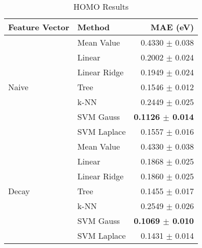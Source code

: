 \documentclass[10pt]{article}
\begin{document}



\begin{table}[H]
  \centering
  \caption{HOMO Results}
  \begin{tabular}{llr}
            Feature Vector     & Method       & MAE (eV)                \\
    \hline\hline
    \multirow{7}{*}{Naive} & Mean Value   & 0.4330 $\pm$ 0.038 \\
                               & Linear       & 0.2002 $\pm$ 0.024 \\
                               & Linear Ridge & 0.1949 $\pm$ 0.024 \\
                               & Tree         & 0.1546 $\pm$ 0.012 \\
                               & k-NN         & 0.2449 $\pm$ 0.025 \\
                               & SVM Gauss    & \textbf{0.1126 $\pm$ 0.014} \\
                               & SVM Laplace  & 0.1557 $\pm$ 0.016 \\
    \hline
    \multirow{7}{*}{Decay}     & Mean Value   & 0.4330 $\pm$ 0.038 \\
                               & Linear       & 0.1868 $\pm$ 0.025 \\
                               & Linear Ridge & 0.1860 $\pm$ 0.025 \\
                               & Tree         & 0.1455 $\pm$ 0.017 \\
                               & k-NN         & 0.2549 $\pm$ 0.026 \\
                               & SVM Gauss    & \textbf{0.1069 $\pm$ 0.010} \\
                               & SVM Laplace  & 0.1431 $\pm$ 0.014 \\

\end{tabular}
\end{table}
\end{document}
